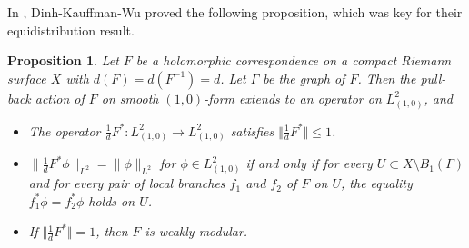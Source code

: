 \documentclass[11pt,letterpaper]{article}
\newtheorem{proposition}[theorem]{Proposition}
\theoremstyle{definition}
\begin{document}
In \cite{DinKauWu20}, Dinh-Kauffman-Wu proved the following proposition, which was key for their equidistribution result.

\begin{proposition}\label{norm}
Let $F$ be a holomorphic correspondence on a compact Riemann surface $X$ with $d(F)=d(F^{-1})=d$. Let $\Gamma$ be the graph of $F$. Then the pull-back action of $F$ on smooth $(1,0)$-form extends to an  operator on $L^2_{(1,0)}$, and
\begin{itemize}
\item[(a)] The operator $\frac{1}{d}F^*:L^2_{(1,0)}\rightarrow L^2_{(1,0)}$ satisfies $\Vert\frac{1}{d}F^*\Vert\leq 1$.
\item[(b)] $\|\frac{1}{d}F^*\phi\|_{L^2}=\|\phi\|_{L^2}$ for $\phi\in L^2_{(1,0)}$ if and only if for every $U\subset X\setminus B_1(\Gamma)$ and for every pair of local branches $f_1$ and $f_2$ of $F$ on $U$, the equality $f_1^*\phi=f_2^*\phi$ holds on $U$.
\item[(c)] If $\Vert\frac{1}{d}F^*\Vert= 1$, then $F$ is weakly-modular.
\end{itemize}
\end{proposition}
\end{document}

